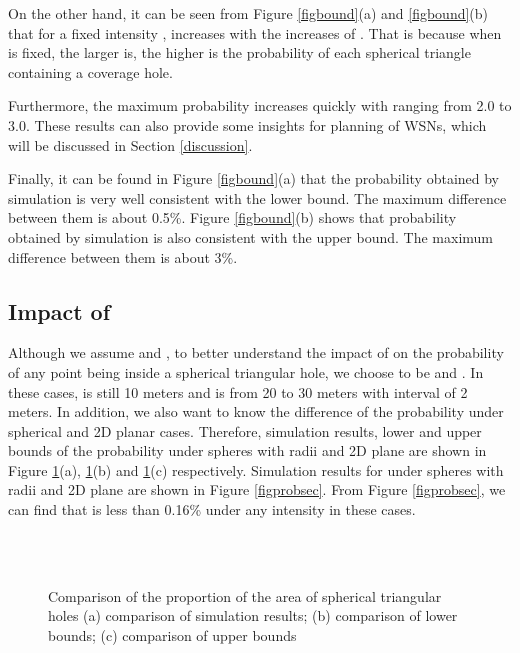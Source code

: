 \documentclass[journal, twoside]{IEEEtran}
\begin{document}
On the other hand, it can be seen from Figure \ref{figbound}(a) and \ref{figbound}(b) that 
for a fixed intensity ,  increases with the increases of . 
That is because when  is fixed, the larger  is, the higher is the probability
of each spherical triangle containing a coverage hole. 

Furthermore, the maximum probability increases quickly with  ranging from 2.0 
to 3.0. These results can also provide some insights for planning of WSNs, which will
be discussed in Section \ref{discussion}.

Finally, it can be found in Figure \ref{figbound}(a) that the probability obtained by 
simulation is very well consistent with the lower bound. The maximum difference 
between them is about 0.5\%. Figure \ref{figbound}(b) shows that probability obtained 
by simulation is also consistent with the upper bound. The maximum difference 
between them is about 3\%.

\subsection{Impact of }

Although we assume  and , to better understand the impact
of  on the probability of any point being inside a spherical triangular hole,
we choose  to be  and . In these cases,  is still 10 meters and  is from 20 to 30 meters with interval of 2 meters. In addition, we also want to
know the difference of the probability under spherical and 2D planar cases.
Therefore, simulation results, lower and upper bounds of the probability
under spheres with radii  and 2D plane are shown
in Figure \ref{figcomp}(a), \ref{figcomp}(b) and \ref{figcomp}(c) respectively.
Simulation results for  under spheres with radii 
 and 2D plane are shown in Figure \ref{figprobsec}.
From Figure \ref{figprobsec}, we can find that  is less
than 0.16\% under any intensity in these cases.

\begin{figure}[!t]
  \centering {}
  \\
  \\
  \caption{Comparison of the proportion of the area of spherical triangular holes (a) comparison of simulation results;
    (b) comparison of lower bounds; (c) comparison of upper bounds}
  \label{figcomp}
\end{figure}
\end{document}
